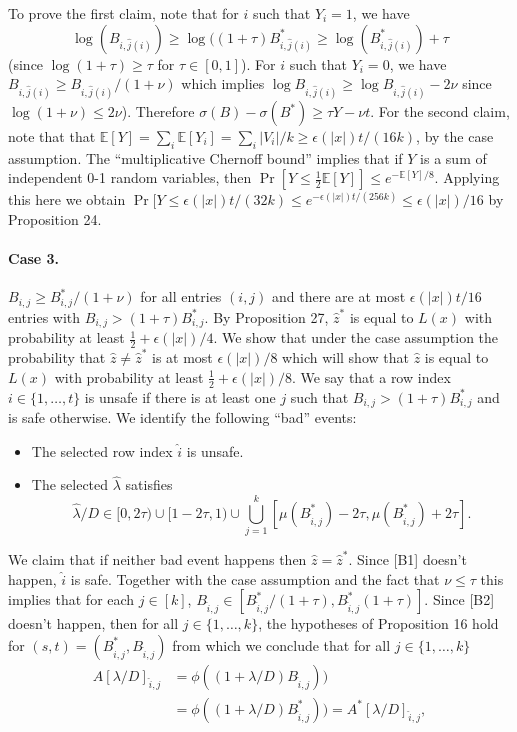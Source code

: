 To prove the first claim, note that for $i$ such that $Y_i=1$, we have
\[\log(B_{i,\hat j(i)})\ge\log((1+\tau)B^*_{i,\hat j(i)}\ge\log(B^*_{i,\hat j(i)})+\tau\]
(since $\log(1+\tau)\ge\tau$ for $\tau\in[0,1]$). For $i$ such that $Y_i=0$, we have $B_{i,\hat j(i)}\ge B_{i,\hat j(i)}/(1+\nu)$ which implies $\log B_{i,\hat j(i)}\ge\log B_{i,\hat j(i)}-2\nu$ since $\log(1+\nu)\le2\nu$). Therefore $\sigma(B)-\sigma(B^*)\ge\tau Y-\nu t$.
For the second claim, note that that $\mathbb E[Y]=\sum_i\mathbb E[Y_i]=\sum_i|V_i|/k\ge\epsilon(|x|)t/(16k)$, by the case assumption. The ``multiplicative Chernoff bound'' implies that if $Y$ is a sum of independent 0-1 random variables, then $\Pr[Y\le\frac12\mathbb E[Y]]\le e^{-\mathbb E[Y]/8}$. Applying this here we obtain $\Pr[Y\le\epsilon(|x|)t/(32k)\le e^{-\epsilon(|x|)t/(256k)}\le\epsilon(|x|)/16$ by Proposition 24.
\paragraph{Case 3.} $B_{i,j}\ge B^*_{i,j}/(1+\nu)$ for all entries $(i,j)$ and there are at most $\epsilon(|x|)t/16$ entries with $B_{i,j}>(1+\tau)B^*_{i,j}$. By Proposition 27, $\hat z^*$ is equal to $L(x)$ with probability at least $\frac12+\epsilon(|x|)/4$. We show that under the case assumption the probability that $\hat z\ne\hat z^*$ is at most $\epsilon(|x|)/8$ which will show that $\hat z$ is equal to $L(x)$ with probability at least $\frac12+\epsilon(|x|)/8$.
We say that a row index $i\in\{1,\ldots,t\}$ is unsafe if there is at least one $j$ such that $B_{i,j}>(1+\tau)B^*_{i,j}$ and is safe otherwise. We identify the following ``bad'' events:
\begin{itemize}\item[B1] The selected row index $\hat i$ is unsafe.
\item[B2] The selected $\hat\lambda$ satisfies
\[\hat\lambda/D\in[0,2\tau)\cup[1-2\tau,1)\cup\bigcup_{j=1}^k[\mu(B^*_{\hat i,j})-2\tau,\mu(B^*_{\hat i,j})+2\tau].\]\end{itemize}
We claim that if neither bad event happens then $\hat z=\hat z^*$. Since [B1] doesn't happen, $\hat i$ is safe. Together with the case assumption and the fact that $\nu\le\tau$ this implies that for each $j\in[k]$, $B_{\hat i,j}\in[B^*_{\hat i,j}/(1+\tau),B^*_{\hat i,j}(1+\tau)]$. Since [B2] doesn't happen, then for all $j\in\{1,\ldots,k\}$, the hypotheses of Proposition 16 hold for $(s,t)=(B^*_{\hat i,j},B_{\hat i,j})$ from which we conclude that for all $j\in\{1,\ldots,k\}$
\begin{align*}A[\lambda/D]_{\hat i,j}&=\phi((1+\lambda/D)B_{\hat i,j}))\\&=\phi((1+\lambda/D)B^*_{\hat i,j}))=A^*[\lambda/D]_{\hat i,j},\end{align*}
